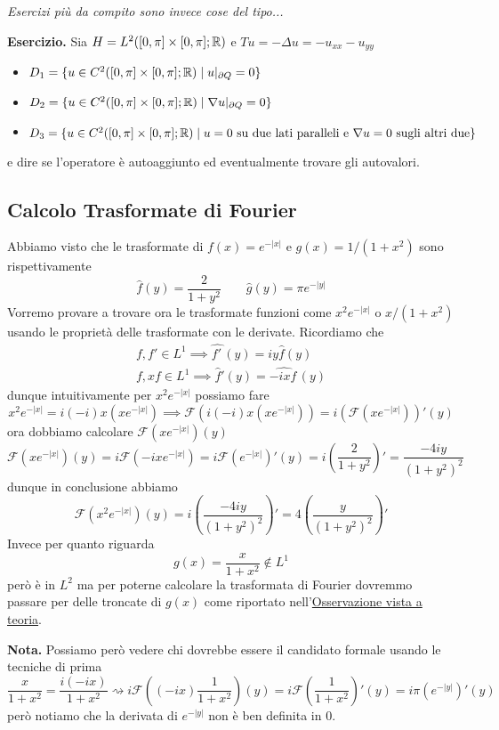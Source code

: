 \textit{Esercizi più da compito sono invece cose del tipo...}

\textbf{Esercizio.}
Sia $H = L^2([0, \pi] \times [0, \pi]; \mathbb R)$ e $T u = -\Delta u = -u_{xx} -u_{yy}$
\begin{itemize}
	\item $D_1 = \{ u \in C^2([0, \pi] \times [0, \pi]; \mathbb R) \mid u|_{\partial Q} = 0 \}$
	\item $D_2 = \{ u \in C^2([0, \pi] \times [0, \pi]; \mathbb R) \mid \nabla u|_{\partial Q} = 0 \}$
	\item $D_3 = \{ u \in C^2([0, \pi] \times [0, \pi]; \mathbb R) \mid \text{$u = 0$ su due lati paralleli e $\nabla u = 0$ sugli altri due} \}$
\end{itemize}
e dire se l'operatore è autoaggiunto ed eventualmente trovare gli autovalori.

\subsection{Calcolo Trasformate di Fourier}

Abbiamo visto che le trasformate di $f(x) = e^{-|x|}$ e $g(x) = 1 / (1 + x^2)$ sono rispettivamente
$$
\hat f(y) = \frac{2}{1 + y^2}
\qquad
\hat g(y) = \pi e^{-|y|}
$$
Vorremo provare a trovare ora le trasformate funzioni come $x^2 e^{-|x|}$ o $x / (1 + x^2)$ usando le proprietà delle trasformate con le derivate. Ricordiamo che
$$
\begin{gathered}
	f, f' \in L^1 \implies \hat{f'\,}(y) = i y \hat f(y) \\
	f, x f \in L^1 \implies \hat{f}'(y) = \hat{-i x f\,}(y)
\end{gathered}
$$
dunque intuitivamente per $x^2 e^{-|x|}$ possiamo fare
$$
x^2 e^{-|x|} = i (-i) x (x e^{-|x|}) \implies \mathcal F(i (-i) x (x e^{-|x|})) = i (\mathcal F(x e^{-|x|}))'(y)
$$
ora dobbiamo calcolare $\mathcal F(x e^{-|x|})(y)$
$$
	\mathcal F(x e^{-|x|})(y) = i \mathcal F(-ix e^{-|x|}) = i \mathcal F(e^{-|x|})'(y) = i \left(\frac{2}{1 + y^2}\right)' = \frac{-4iy}{(1+y^2)^2}
$$
dunque in conclusione abbiamo
$$
	\mathcal F(x^2 e^{-|x|})(y) = i \left(\frac{-4iy}{(1 + y^2)^2}\right)' = 4 \left(\frac{y}{(1 + y^2)^2}\right)'
$$
Invece per quanto riguarda
$$
g(x) = \frac{x}{1+x^2} \notin L^1
$$
però è in $L^2$ ma per poterne calcolare la trasformata di Fourier dovremmo passare per delle troncate di $g(x)$ come riportato nell'\hyperlink{oss-trasformata-su-ldue}{Osservazione vista a teoria}. 

\textbf{Nota.} Possiamo però vedere chi dovrebbe essere il candidato formale usando le tecniche di prima
$$
	\frac{x}{1+x^2} = \frac{i (-ix)}{1+x^2} \rightsquigarrow 
	i \mathcal F \left( (-ix) \frac{1}{1+x^2} \right)(y)
	= i \mathcal F \left( \frac{1}{1+x^2} \right)'(y) = i \pi (e^{-|y|})'(y)
$$
però notiamo che la derivata di $e^{-|y|}$ non è ben definita in $0$.

